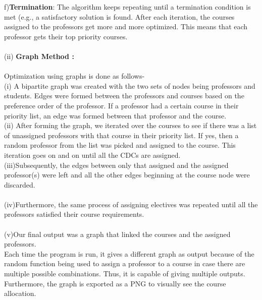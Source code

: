 \documentclass[a4paper,12pt]{article}
\begin{document}
f)\textbf{Termination}: The algorithm keeps repeating until a termination condition is met (e.g., a satisfactory solution is found. After each iteration, the courses assigned to the professors get more and more optimized. This means that each professor gets their top priority courses.
 \\ \\
(ii)\textbf{ Graph Method :}\\ \\
Optimization using graphs is done as follows-
\\
(i) A bipartite graph was created with the two sets of nodes being professors and students. Edges were formed between the professors and courses based on the preference order of the professor. If a professor had a certain course in their priority list, an edge was formed between that professor and the course.\\

(ii) After forming the graph, we iterated over the courses to see if there was a list of unassigned professors with that course in their priority list. If yes, then a random professor from the list was picked and assigned to the course. This iteration goes on and on until all the CDCs are assigned.\\
(iii)Subsequently, the edges between only that assigned and the assigned professor(s) were left and all the other edges beginning at the course node were discarded.\\ \\
(iv)Furthermore, the same process of assigning electives was repeated until all the professors satisfied their course requirements.\\ \\
(v)Our final output was a graph that linked the courses and the assigned professors.\\
Each time the program is run, it gives a different graph as output because of the random function being used to assign a professor to a course in case there are multiple possible combinations. Thus, it is capable of giving multiple outputs.
Furthermore, the graph is exported as a PNG to visually see the course allocation. \\ \\
\end{document}
